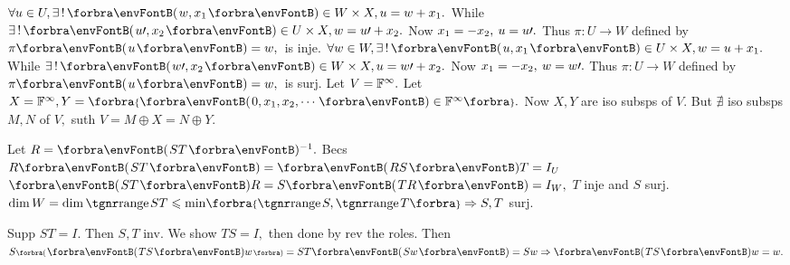 $\forall u\in U,\exists\,!\,\Par{w,x_1}\in W\times X,u=w+x_1.$ While $\exists\,!\,\Par{u\apostrophe,x_2}\in U\times X,w=u\apostrophe+x_2.$\parSol{}
Now $x_1=-x_2,\:u=u\prime.$ Thus $\pi:U\rightarrow W$ defined by $\pi\Par{u}=w,$ \,is inje.\parSol{\vspace{3pt}}
$\forall w\in W,\exists\,!\,\Par{u,x_1}\in U\times X,w=u+x_1.$ While $\exists\,!\,\Par{w\apostrophe,x_2}\in W\times X,u=w\apostrophe+x_2.$\parSol{}
Now $x_1=-x_2,\:w=w\prime.$ Thus $\pi:U\rightarrow W$ defined by $\pi\Par{u}=w,$ \,is surj.\PfEnd\vspace{4pt}
\AComm Let $V={\mathbb{F}}^{\infty}.$ Let $X=\Fbb^{\infty},Y=\Bra{\Par{0,x_1,x_2,\cdots}\in\Fbb^{\infty}}.$ Now $X,Y$ are iso subsps of $V.$\parCom
But $\nexists$ iso subsps $M,N$ of $V,$ suth $V=M\oplus X=N\oplus Y.$
\SepLine



Let $R=\Par{ST}{^{-1}}.$ Becs $R\Par{ST}=\Par{RS}T=I_U$ \OR $\Par{ST}R=S\Par{TR}=I_W,$ $T$ inje and $S$ surj.\PfEnd\parSol{}
\Or $\dim W=\dim\range ST\leqslant\min\!\Bra{\range S,\range T}\Rightarrow S,T$ surj.\PfEnd
\SepLine

Supp $ST=I.$ Then $S,T$ inv. We show $TS=I,$ then done by rev the roles.\parSol{}
Then $S\BigPar{\Par{TS}w}=ST\Par{Sw}=Sw\Rightarrow\Par{TS}w=w.$ \;\PfEnd
\SepLine

